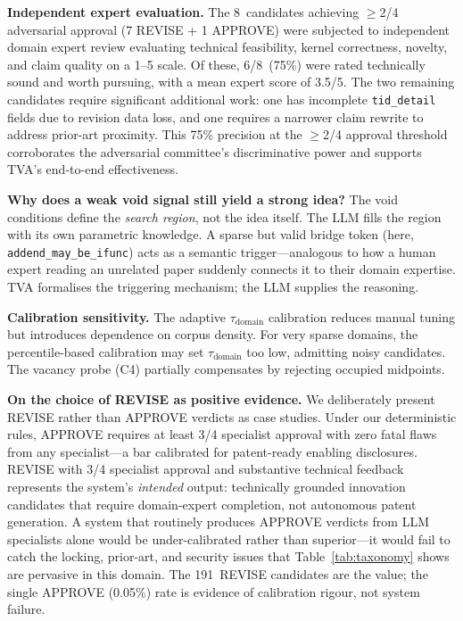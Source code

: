 \documentclass[11pt,twocolumn]{article}
\newcommand{\taudomain}{\tau_{\mathrm{domain}}}
\begin{document}
\textbf{Independent expert evaluation.}
The 8~candidates achieving $\geq$2/4 adversarial approval (7 REVISE + 1 APPROVE) were subjected to independent domain expert
review evaluating technical feasibility, kernel correctness, novelty,
and claim quality on a 1--5 scale.
Of these, 6/8~(75\%) were rated technically sound and worth pursuing,
with a mean expert score of 3.5/5.
The two remaining candidates require significant additional work: one
has incomplete \texttt{tid\_detail} fields due to revision data loss,
and one requires a narrower claim rewrite to address prior-art
proximity.
This 75\% precision at the $\geq$2/4 approval threshold corroborates
the adversarial committee's discriminative power and supports TVA's
end-to-end effectiveness.

\textbf{Why does a weak void signal still yield a strong idea?}
The void conditions define the \emph{search region}, not the idea
itself.  The LLM fills the region with its own parametric knowledge.
A sparse but valid bridge token (here, \texttt{addend\_may\_be\_ifunc})
acts as a semantic trigger---analogous to how a human expert reading an
unrelated paper suddenly connects it to their domain expertise.  TVA
formalises the triggering mechanism; the LLM supplies the reasoning.

\textbf{Calibration sensitivity.}  The adaptive $\taudomain$
calibration reduces manual tuning but introduces dependence on corpus
density.  For very sparse domains, the percentile-based calibration may
set $\taudomain$ too low, admitting noisy candidates.  The vacancy
probe (C4) partially compensates by rejecting occupied midpoints.

\textbf{On the choice of REVISE as positive evidence.}
We deliberately present REVISE rather than APPROVE verdicts as case
studies.  Under our deterministic rules, APPROVE requires at least 3/4
specialist approval with zero fatal flaws from any specialist---a
bar calibrated for patent-ready enabling disclosures.
REVISE with 3/4 specialist approval and substantive technical feedback
represents the system's \emph{intended} output: technically grounded
innovation candidates that require domain-expert completion, not
autonomous patent generation.  A system that routinely produces APPROVE
verdicts from LLM specialists alone would be under-calibrated rather
than superior---it would fail to catch the locking, prior-art, and
security issues that Table~\ref{tab:taxonomy} shows are pervasive in
this domain.  The 191~REVISE candidates are the value; the single APPROVE (0.05\%)
rate is evidence of calibration rigour, not system failure.
\end{document}
